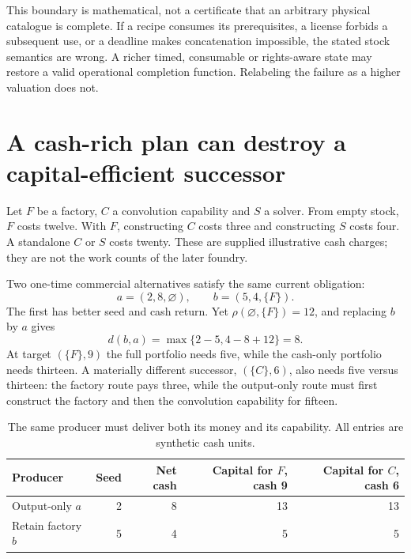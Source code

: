 \documentclass[11pt,letterpaper]{article}
\theoremstyle{definition}\newtheorem{definition}[theorem]{Definition}
\theoremstyle{remark}\newtheorem{remark}[theorem]{Remark}
\begin{document}
This boundary is mathematical, not a certificate that an arbitrary physical catalogue is complete. If a recipe consumes its prerequisites, a license forbids a subsequent use, or a deadline makes concatenation impossible, the stated stock semantics are wrong. A richer timed, consumable or rights-aware state may restore a valid operational completion function. Relabeling the failure as a higher valuation does not.

\section{A cash-rich plan can destroy a capital-efficient successor}
\label{sec:cash_example}
Let $F$ be a factory, $C$ a convolution capability and $S$ a solver. From empty stock, $F$ costs twelve. With $F$, constructing $C$ costs three and constructing $S$ costs four. A standalone $C$ or $S$ costs twenty. These are supplied illustrative cash charges; they are not the work counts of the later foundry.

Two one-time commercial alternatives satisfy the same current obligation:
\begin{equation}
 a=(2,8,\varnothing),\qquad b=(5,4,\{F\}).
 \label{eq:cash_example}
\end{equation}
The first has better seed and cash return. Yet $\rho(\varnothing,\{F\})=12$, and replacing $b$ by $a$ gives
\begin{equation}
 d(b,a)=\max\{2-5,4-8+12\}=8.
\end{equation}
At target $(\{F\},9)$ the full portfolio needs five, while the cash-only portfolio needs thirteen. A materially different successor, $(\{C\},6)$, also needs five versus thirteen: the factory route pays three, while the output-only route must first construct the factory and then the convolution capability for fifteen.

\begin{table}[htbp]\centering\small
\caption{The same producer must deliver both its money and its capability. All entries are synthetic cash units.}
\begin{tabularx}{\linewidth}{@{}Yrrrr@{}}\toprule
Producer & Seed & Net cash & Capital for $F$, cash 9 & Capital for $C$, cash 6\\\midrule
Output-only $a$ & 2 & 8 & 13 & 13\\
Retain factory $b$ & 5 & 4 & 5 & 5\\\bottomrule
\end{tabularx}
\label{tab:cash}
\end{table}
\end{document}
